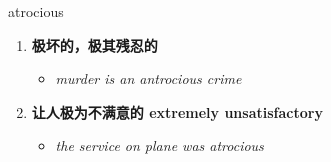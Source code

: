 
\begin{frame}
{\huge atrocious}
\begin{center}
\begin{enumerate}\Large
  \item \textbf{极坏的，极其残忍的}
  \begin{itemize}
    \item \em{\Large{murder is an antrocious crime}}
  \end{itemize}
  \item \textbf{让人极为不满意的 extremely unsatisfactory}
  \begin{itemize}
    \item \em{\Large{the service on plane was atrocious}}
  \end{itemize}
\end{enumerate}
\end{center}
\end{frame}
